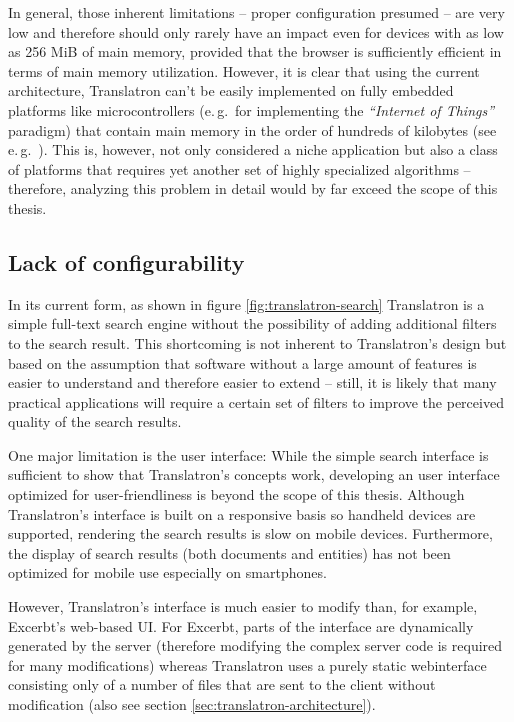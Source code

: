 \documentclass[a4paper, 12pt, twoside, reqn]{report}
\numberwithin{figure}{chapter}
\newtheorem[L]{boxedDefinition}{Definition}
\newtheorem[L]{boxedExample}{Example}
\newcommand{\eg}{e.\,g.\ }
\newcommand{\itquote}[1]{\textit{{``}#1{''}}}
\begin{document}
In general, those inherent limitations -- proper configuration presumed -- are very low and therefore should only rarely have an impact even for devices with as low as 256 MiB of main memory, provided that the browser is sufficiently efficient in terms of main memory utilization. However, it is clear that using the current architecture, Translatron can't be easily implemented on fully embedded platforms like microcontrollers (\eg for implementing the \itquote{Internet of Things} paradigm) that contain main memory in the order of hundreds of kilobytes (see \eg\hspace{-.2em}\cite{stm32f407}). This is, however, not only considered a niche application but also a class of platforms that requires yet another set of highly specialized algorithms -- therefore, analyzing this problem in detail would by far exceed the scope of this thesis.

\subsection{Lack of configurability}\label{ssec:lack-of-configurability}

In its current form, as shown in figure \vref{fig:translatron-search} Translatron is a simple full-text search engine without the possibility of adding additional filters to the search result. This shortcoming is not inherent to Translatron's design but based on the assumption that software without a large amount of features is easier to understand and therefore easier to extend -- still, it is likely that many practical applications will require a certain set of filters to improve the perceived quality of the search results.

One major limitation is the user interface: While the simple search interface is sufficient to show that Translatron's  concepts work, developing an user interface optimized for user-friendliness is beyond the scope of this thesis. Although Translatron's interface is built on a responsive basis so handheld devices are supported, rendering the search results is slow on mobile devices. Furthermore, the display of search results (both documents and entities) has not been optimized for mobile use especially on smartphones.

However, Translatron's interface is much easier to modify than, for example, Excerbt's web-based UI. For Excerbt, parts of the interface are dynamically generated by the server (therefore modifying the complex server code is required for many modifications) whereas Translatron uses a purely static webinterface consisting only of a number of files that are sent to the client without modification (also see section \ref{sec:translatron-architecture}).
\end{document}
